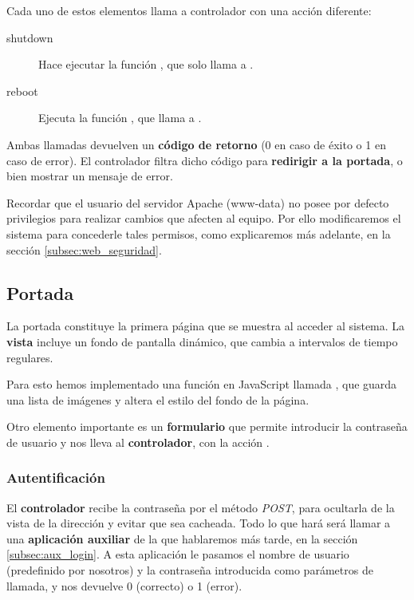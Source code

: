 \smallskip

Cada uno de estos elementos llama a controlador con una acción diferente:

\begin{description}
	\item[shutdown] Hace ejecutar la función , que solo llama a .

	\item[reboot] Ejecuta la función , que llama a .
\end{description}

Ambas llamadas devuelven un \textbf{código de retorno} (0 en caso de éxito o 1 en caso de error). El controlador filtra dicho código para \textbf{redirigir a la portada}, o bien mostrar un mensaje de error.

Recordar que el usuario del servidor Apache (www-data) no posee por defecto privilegios para realizar cambios que afecten al equipo. Por ello modificaremos el sistema para concederle tales permisos, como explicaremos más adelante, en la sección \ref{subsec:web_seguridad}.

\subsection{Portada}
\label{subsec:impl_portada}

La portada constituye la primera página que se muestra al acceder al sistema. La \textbf{vista} incluye un fondo de pantalla dinámico, que cambia a intervalos de tiempo regulares.

Para esto hemos implementado una función en JavaScript llamada , que guarda una lista de imágenes y altera el estilo del fondo de la página.

Otro elemento importante es un \textbf{formulario} que permite introducir la contraseña de usuario y nos lleva al \textbf{controlador}, con la acción .

\subsubsection{Autentificación}

El \textbf{controlador} recibe la contraseña por el método \textit{POST}, para ocultarla de la vista de la dirección y evitar que sea cacheada. Todo lo que hará será llamar a una \textbf{aplicación auxiliar} de la que hablaremos más tarde, en la sección \ref{subsec:aux_login}. A esta aplicación le pasamos el nombre de usuario (predefinido por nosotros) y la contraseña introducida como parámetros de llamada, y nos devuelve 0 (correcto) o 1 (error).

